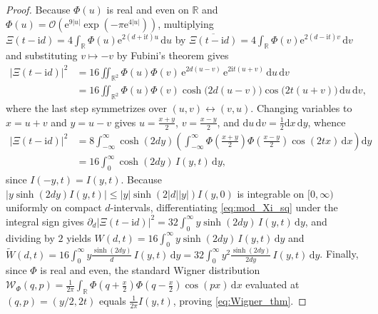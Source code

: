 \documentclass[11pt,a4paper,reqno]{amsart}
\theoremstyle{definition}
\theoremstyle{remark}
\numberwithin{equation}{section}
\newcommand{\dd}{\mathrm{d}}
\newcommand{\ii}{\mathrm{i}}
\newcommand{\ee}{\mathrm{e}}
\newcommand{\Wig}{\mathcal{W}}
\newcommand{\Wtil}{\widetilde{W}}
\begin{document}
\begin{proof}
Because $\Phi(u)$ is real and even on $\mathbb{R}$ and $\Phi(u) = \mathcal{O}(\ee^{9|u|}\exp(-\pi\ee^{4|u|}))$, multiplying $\Xi(t-\ii d) = 4\int_{\mathbb{R}}\Phi(u)\ee^{2(d+\ii t)u}\,\dd u$ by $\overline{\Xi(t-\ii d)} = 4\int_{\mathbb{R}}\Phi(v)\ee^{2(d-\ii t)v}\,\dd v$ and substituting $v \mapsto -v$ by Fubini's theorem gives
\[
\begin{aligned}
\big|\Xi(t-\ii d)\big|^2 &= 16\iint_{\mathbb{R}^2} \Phi(u)\Phi(v)\,\ee^{2d(u-v)}\,\ee^{2\ii t(u+v)}\,\dd u\,\dd v \\
&= 16\iint_{\mathbb{R}^2} \Phi(u)\Phi(v)\cosh\big(2d(u-v)\big)\cos\big(2t(u+v)\big)\,\dd u\,\dd v,
\end{aligned}
\]
where the last step symmetrizes over $(u,v) \leftrightarrow (v,u)$. Changing variables to $x = u + v$ and $y = u - v$ gives $u = \frac{x+y}{2}$, $v = \frac{x-y}{2}$, and $\dd u\,\dd v = \frac{1}{2}\dd x\,\dd y$, whence
\[
\begin{aligned}
\big|\Xi(t-\ii d)\big|^2 &= 8\int_{-\infty}^\infty \cosh(2d y)\left(\int_{-\infty}^\infty \Phi\!\left(\frac{x+y}{2}\right)\Phi\!\left(\frac{x-y}{2}\right)\cos(2t x)\,\dd x\right)\dd y \\
&= 16\int_0^\infty \cosh(2d y)\,I(y,t)\,\dd y,
\end{aligned}
\]
since $I(-y,t) = I(y,t)$. Because $|y\sinh(2d y)I(y,t)| \le |y|\sinh(2|d||y|)I(y,0)$ is integrable on $[0,\infty)$ uniformly on compact $d$-intervals, differentiating \eqref{eq:mod_Xi_sq} under the integral sign gives $\partial_d|\Xi(t-\ii d)|^2 = 32\int_0^\infty y\sinh(2d y)\,I(y,t)\,\dd y$, and dividing by $2$ yields $W(d,t) = 16\int_0^\infty y\sinh(2d y)\,I(y,t)\,\dd y$ and $\Wtil(d,t) = 16\int_0^\infty y\frac{\sinh(2d y)}{d}\,I(y,t)\,\dd y = 32\int_0^\infty y^2\frac{\sinh(2d y)}{2d y}\,I(y,t)\,\dd y$. Finally, since $\Phi$ is real and even, the standard Wigner distribution $\Wig_\Phi(q,p) = \frac{1}{2\pi}\int_{\mathbb{R}}\Phi(q+\frac{x}{2})\Phi(q-\frac{x}{2})\cos(p x)\,\dd x$ evaluated at $(q,p) = (y/2, 2t)$ equals $\frac{1}{2\pi}I(y,t)$, proving \eqref{eq:Wigner_thm}.
\end{proof}
\end{document}
